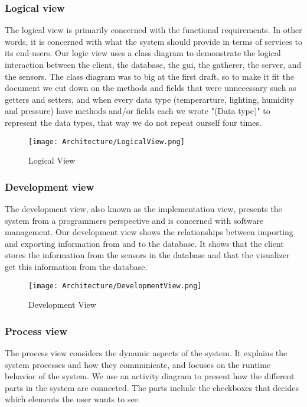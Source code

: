 \documentclass[../document.tex]{subfiles}
\begin{document}
\subsubsection{Logical view}		
The logical view is primarily concerned with the functional requirements. In other words, it is concerned with what the system should provide in terms of services to its end-users. Our logic view uses a class diagram to demonstrate the logical interaction between the client, the database, the gui, the gatherer, the server, and the sensors. The class diagram was to big at the first draft, so to make it fit the document we cut down on the methods and fields that were unnecessary such as getters and setters, and when every data type (temperarture, lighting, humidity and pressure) have methods and/or fields each we wrote "(Data type)" to represent the data types, that way we do not repeat ourself four times. 

\begin{figure}[H]
	\centering
	\texttt{[image: Architecture/LogicalView.png]}
	\caption{Logical View}
\end{figure}

\subsubsection{Development view}
The development view, also known as the implementation view,  presents the system from a programmers perspective and is concerned with software management. Our development view shows the relationships between importing and exporting information from and to the database. It shows that the client stores the information from the sensors in the database and that the visualizer get this information from the database.

\begin{figure}[H]
	\centering
	\texttt{[image: Architecture/DevelopmentView.png]}
	\caption{Development View}
\end{figure}

\subsubsection{Process view}
The process view considers the dynamic aspects of the system. It explains the system processes and how they communicate, and focuses on the runtime behavior of the system. We use an activity diagram to present how the different parts in the system are connected. The parts include the checkboxes that decides which elements the user wants to see. 
\end{document}
